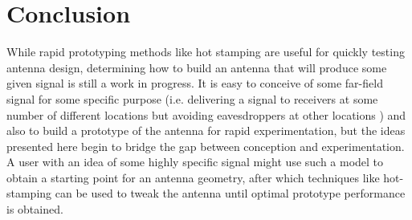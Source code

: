 \documentclass[11pt]{article}
\begin{document}
%
%
%
%

\section*{Conclusion}

\noindent While rapid prototyping methods like hot stamping are useful for quickly testing antenna design, determining how to build an antenna that will produce some given signal is still a work in progress. It is easy to conceive of some far-field signal for some specific purpose (i.e. delivering a signal to receivers at some number of different locations but avoiding eavesdroppers at other locations	) and also to build a prototype of the antenna for rapid experimentation, but the ideas presented here begin to bridge the gap between conception and experimentation. A user with an idea of some highly specific signal might use such a model to obtain a starting point for an antenna geometry, after which techniques like hot-stamping can be used to tweak the antenna until optimal prototype performance is obtained. \\
\end{document}
